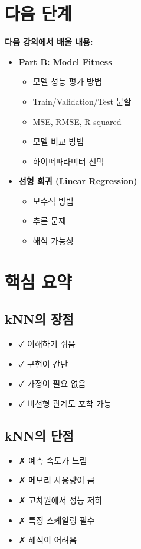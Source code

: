 \documentclass[12pt,a4paper]{article}
\begin{document}
\section{다음 단계}

\textbf{다음 강의에서 배울 내용:}

\begin{itemize}
    \item \textbf{Part B: Model Fitness}
    \begin{itemize}
        \item 모델 성능 평가 방법
        \item Train/Validation/Test 분할
        \item MSE, RMSE, R-squared
        \item 모델 비교 방법
        \item 하이퍼파라미터 선택
    \end{itemize}

    \item \textbf{선형 회귀 (Linear Regression)}
    \begin{itemize}
        \item 모수적 방법
        \item 추론 문제
        \item 해석 가능성
    \end{itemize}
\end{itemize}

\section{핵심 요약}

\subsection{kNN의 장점}

\begin{itemize}
    \item ✓ 이해하기 쉬움
    \item ✓ 구현이 간단
    \item ✓ 가정이 필요 없음
    \item ✓ 비선형 관계도 포착 가능
\end{itemize}

\subsection{kNN의 단점}

\begin{itemize}
    \item ✗ 예측 속도가 느림
    \item ✗ 메모리 사용량이 큼
    \item ✗ 고차원에서 성능 저하
    \item ✗ 특징 스케일링 필수
    \item ✗ 해석이 어려움
\end{itemize}
\end{document}
